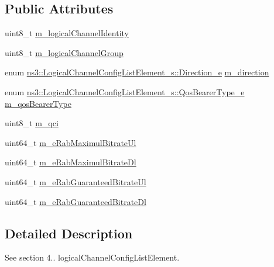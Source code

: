 \subsection*{Public Attributes}
\begin{DoxyCompactItemize}
\item 
uint8\+\_\+t \hyperlink{structns3_1_1LogicalChannelConfigListElement__s_acaefb394f6723f2af1f9e7c0848299ae}{m\+\_\+logical\+Channel\+Identity}
\item 
uint8\+\_\+t \hyperlink{structns3_1_1LogicalChannelConfigListElement__s_a7916fe1192c480cc18781e2c002ea067}{m\+\_\+logical\+Channel\+Group}
\item 
enum \hyperlink{structns3_1_1LogicalChannelConfigListElement__s_a0ce1e3a6af4d9a3e9fc19361d0af4e00}{ns3\+::\+Logical\+Channel\+Config\+List\+Element\+\_\+s\+::\+Direction\+\_\+e} \hyperlink{structns3_1_1LogicalChannelConfigListElement__s_a88386693b606e17a7328612b840c5e0d}{m\+\_\+direction}
\item 
enum \hyperlink{structns3_1_1LogicalChannelConfigListElement__s_a4b3d593978adeb6b101b9492d89aad3e}{ns3\+::\+Logical\+Channel\+Config\+List\+Element\+\_\+s\+::\+Qos\+Bearer\+Type\+\_\+e} \hyperlink{structns3_1_1LogicalChannelConfigListElement__s_a56e0a315cb2ecb0cd9864c5e2580cc1c}{m\+\_\+qos\+Bearer\+Type}
\item 
uint8\+\_\+t \hyperlink{structns3_1_1LogicalChannelConfigListElement__s_a51bd7b0fc2b95c07c5aafdc20c2e4ab2}{m\+\_\+qci}
\item 
uint64\+\_\+t \hyperlink{structns3_1_1LogicalChannelConfigListElement__s_a13a9ac32598f18387bacdd920602042a}{m\+\_\+e\+Rab\+Maximul\+Bitrate\+Ul}
\item 
uint64\+\_\+t \hyperlink{structns3_1_1LogicalChannelConfigListElement__s_adba43d90f7ab1df78e2b164523775413}{m\+\_\+e\+Rab\+Maximul\+Bitrate\+Dl}
\item 
uint64\+\_\+t \hyperlink{structns3_1_1LogicalChannelConfigListElement__s_a8360928bddc9ce35f6357e764a3d1cfa}{m\+\_\+e\+Rab\+Guaranteed\+Bitrate\+Ul}
\item 
uint64\+\_\+t \hyperlink{structns3_1_1LogicalChannelConfigListElement__s_a2e714ef5e981f6c08f8a1a00932d827d}{m\+\_\+e\+Rab\+Guaranteed\+Bitrate\+Dl}
\end{DoxyCompactItemize}


\subsection{Detailed Description}
See section 4.. logical\+Channel\+Config\+List\+Element. 

